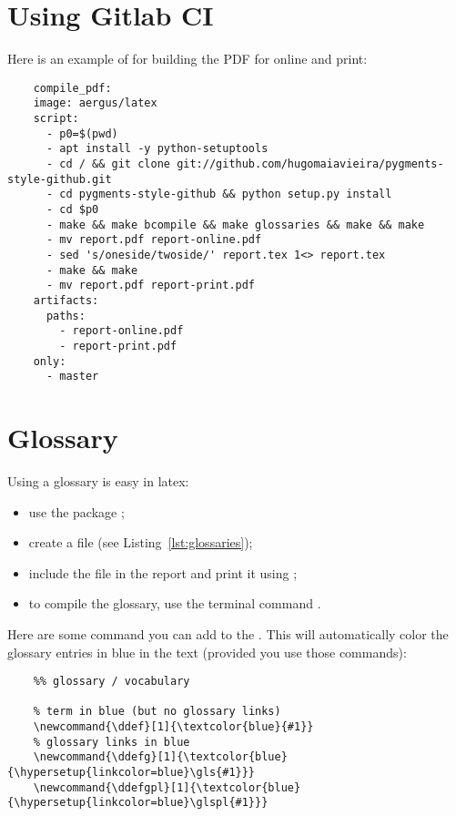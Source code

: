 \section{Using Gitlab CI}

Here is an example of  for building the PDF for online and print:

\begin{verbatim}
    compile_pdf:
    image: aergus/latex
    script:
      - p0=$(pwd) 
      - apt install -y python-setuptools 
      - cd / && git clone git://github.com/hugomaiavieira/pygments-style-github.git
      - cd pygments-style-github && python setup.py install 
      - cd $p0
      - make && make bcompile && make glossaries && make && make
      - mv report.pdf report-online.pdf
      - sed 's/oneside/twoside/' report.tex 1<> report.tex
      - make && make
      - mv report.pdf report-print.pdf
    artifacts:
      paths:
        - report-online.pdf
        - report-print.pdf
    only:
      - master     
\end{verbatim}


\section{Glossary}

Using a glossary is easy in latex:
\begin{itemize}
    \item use the package ;
    \item create a  file (see Listing~\ref{lst:glossaries});
    \item include the file in the report and print it using \code{\\printglossary};
    \item to compile the glossary, use the terminal command .
\end{itemize}


Here are some command you can add to the . This will automatically color the glossary entries in blue in the text (provided you use those commands):

\begin{verbatim}
    %% glossary / vocabulary

    % term in blue (but no glossary links)
    \newcommand{\ddef}[1]{\textcolor{blue}{#1}}
    % glossary links in blue
    \newcommand{\ddefg}[1]{\textcolor{blue}{\hypersetup{linkcolor=blue}\gls{#1}}}
    \newcommand{\ddefgpl}[1]{\textcolor{blue}{\hypersetup{linkcolor=blue}\glspl{#1}}}
\end{verbatim}

